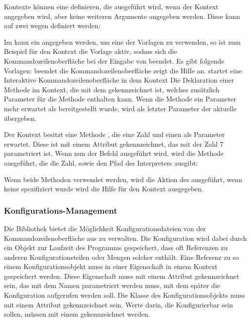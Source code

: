 Kontexte können eine  definieren, die ausgeführt wird, wenn der Kontext angegeben wird, aber keine weiteren Argumente angegeben werden.
Diese kann auf zwei wegen definiert werden:
\begin{outline}
 \1 Im  kann ein  angegeben werden, um eine der Vorlagen zu verwenden, 
 so ist zum Beispiel für den  Kontext die  Vorlage aktiv,
 sodass sich die Kommandozeilenoberfläche bei der Eingabe von  beendet.
 Es gibt folgende Vorlagen:
 \2  beendet die Kommandozeilenoberfläche
 \2  zeigt die Hilfe an.
 \2  startet eine Interaktive Kommandozeilenoberfläche in dem Kontext 
 \1 Die Deklaration einer Methode im Kontext, die mit dem  gekennzeichnet ist,
 welches zusätzlich Parameter für die Methode enthalten kann.
 Wenn die Methode ein Parameter mehr erwartet als bereitgestellt wurde, wird als letzter Parameter der aktuelle  übergeben.
 
 Der  Kontext besitzt eine Methode , die eine Zahl und einen  als Parameter erwartet.
 Diese ist mit einem  Attribut gekennzeichnet, das mit der Zahl 7 parametriert ist.
 Wenn nun der Befehl  ausgeführt wird, wird die  Methode ausgeführt, die die Zahl, sowie den Pfad des Interpreters ausgibt:
\end{outline}
 Wenn beide Methoden verwendet werden, wird die Aktion des  ausgeführt, wenn keine spezifiziert wurde wird die Hilfe für den Kontext ausgegeben.

\subsubsection{Konfigurations-Management}\label{ConfigurationManagement}
Die Bibliothek bietet die Möglichkeit Konfigurationsdateien von der Kommandozeilenoberfläche aus zu verwalten.
Die Konfiguration wird dabei durch ein Objekt zur Laufzeit des Programms gespeichert, dass oft Referenzen zu anderen Konfigurationsteilen oder Mengen solcher enthält.
Eine Referenz zu so einem Konfigurationsobjekt muss in einer Eigenschaft in einem Kontext gespeichert werden.
Diese Eigenschaft muss mit einem  Attribut gekennzeichnet sein, das mit dem Namen parametriert werden muss, mit dem später die Konfiguration aufgerufen werden soll.
Die Klasse des Konfigurationsobjekts muss mit einem  Attribut gekennzeichnet sein.
Werte darin, die Konfigurierbar sein sollen, müssen mit einem  gekennzeichnet werden.

